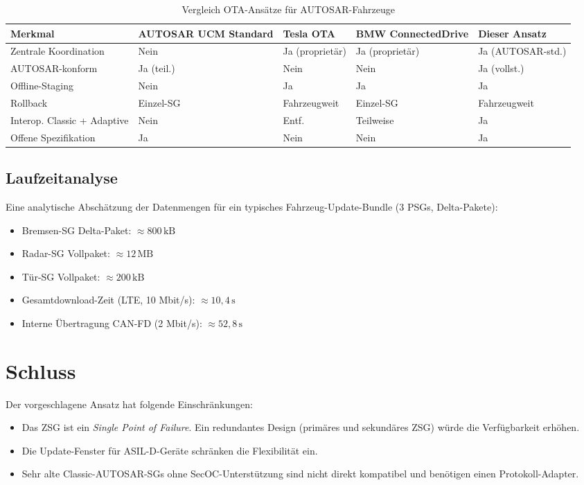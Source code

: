 ﻿\documentclass[12pt,a4paper,twoside]{article}
\begin{document}
\begin{table}[htbp]
  \centering
  \caption{Vergleich OTA-Ansätze für AUTOSAR-Fahrzeuge}
  \label{tab:comparison}
  \begin{tabularx}{\textwidth}{lXXXX}
    \toprule
    \textbf{Merkmal} & \textbf{AUTOSAR UCM Standard} &
    \textbf{Tesla OTA} & \textbf{BMW ConnectedDrive} &
    \textbf{Dieser Ansatz} \\
    \midrule
    Zentrale Koordination & Nein & Ja (proprietär) & Ja (proprietär) & Ja (AUTOSAR-std.) \\
    AUTOSAR-konform & Ja (teil.) & Nein & Nein & Ja (vollst.) \\
    Offline-Staging & Nein & Ja & Ja & Ja \\
    Rollback & Einzel-SG & Fahrzeugweit & Einzel-SG & Fahrzeugweit \\
    Interop. Classic + Adaptive & Nein & Entf. & Teilweise & Ja \\
    Offene Spezifikation & Ja & Nein & Nein & Ja \\
    \bottomrule
  \end{tabularx}
\end{table}

\subsection{Laufzeitanalyse}

Eine analytische Abschätzung der Datenmengen für ein typisches
Fahrzeug-Update-Bundle (3 PSGs, Delta-Pakete):

\begin{itemize}
  \item Bremsen-SG Delta-Paket: $\approx 800\,\text{kB}$
  \item Radar-SG Vollpaket: $\approx 12\,\text{MB}$
  \item Tür-SG Vollpaket: $\approx 200\,\text{kB}$
  \item Gesamtdownload-Zeit (LTE, 10 Mbit/s): $\approx 10{,}4\,\text{s}$
  \item Interne Übertragung CAN-FD (2 Mbit/s): $\approx 52{,}8\,\text{s}$
\end{itemize}


\section{Schluss}

Der vorgeschlagene Ansatz hat folgende Einschränkungen:
\begin{itemize}
  \item Das ZSG ist ein \emph{Single Point of Failure}. Ein redundantes
    Design (primäres und sekundäres ZSG) würde die Verfügbarkeit erhöhen.
  \item Die Update-Fenster für ASIL-D-Geräte schränken die Flexibilität ein.
  \item Sehr alte Classic-AUTOSAR-SGs ohne SecOC-Unterstützung sind nicht
    direkt kompatibel und benötigen einen Protokoll-Adapter.
\end{itemize}
\end{document}
